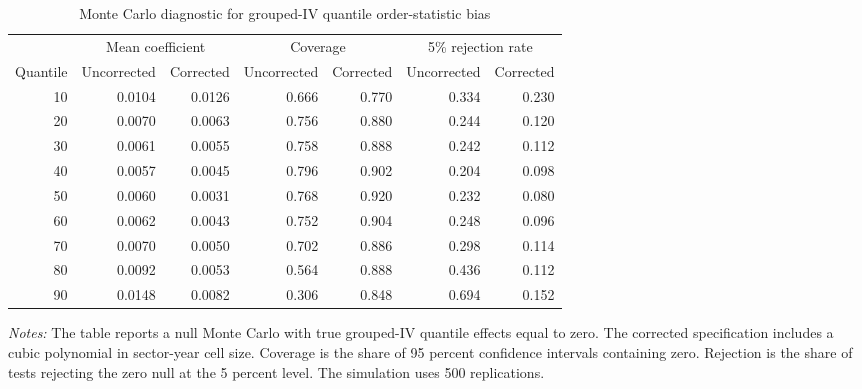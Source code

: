 ﻿\documentclass[12pt]{article}
\newenvironment{fittabular}[1]{\begin{adjustbox}{max width=\textwidth}\begin{tabular}{#1}}{\end{tabular}\end{adjustbox}}
\begin{document}
\begin{table}[htbp]
\centering
\caption{Monte Carlo diagnostic for grouped-IV quantile order-statistic bias}
\label{tab:mc_order_stat}
\scriptsize
\setlength{\tabcolsep}{4pt}
\begin{fittabular}{rrrrrrr}
\toprule
& \multicolumn{2}{c}{Mean coefficient} & \multicolumn{2}{c}{Coverage} & \multicolumn{2}{c}{5\% rejection rate} \\
\cmidrule(lr){2-3}\cmidrule(lr){4-5}\cmidrule(lr){6-7}
Quantile & Uncorrected & Corrected & Uncorrected & Corrected & Uncorrected & Corrected \\
\midrule
10 & 0.0104 & 0.0126 & 0.666 & 0.770 & 0.334 & 0.230 \\
20 & 0.0070 & 0.0063 & 0.756 & 0.880 & 0.244 & 0.120 \\
30 & 0.0061 & 0.0055 & 0.758 & 0.888 & 0.242 & 0.112 \\
40 & 0.0057 & 0.0045 & 0.796 & 0.902 & 0.204 & 0.098 \\
50 & 0.0060 & 0.0031 & 0.768 & 0.920 & 0.232 & 0.080 \\
60 & 0.0062 & 0.0043 & 0.752 & 0.904 & 0.248 & 0.096 \\
70 & 0.0070 & 0.0050 & 0.702 & 0.886 & 0.298 & 0.114 \\
80 & 0.0092 & 0.0053 & 0.564 & 0.888 & 0.436 & 0.112 \\
90 & 0.0148 & 0.0082 & 0.306 & 0.848 & 0.694 & 0.152 \\
\bottomrule
\end{fittabular}
\begin{minipage}{0.88\textwidth}
\footnotesize
\vspace{0.5em}
\emph{Notes:} The table reports a null Monte Carlo with true grouped-IV quantile effects equal to zero. The corrected specification includes a cubic polynomial in sector-year cell size. Coverage is the share of 95 percent confidence intervals containing zero. Rejection is the share of tests rejecting the zero null at the 5 percent level. The simulation uses 500 replications.
\end{minipage}
\end{table}
\end{document}
